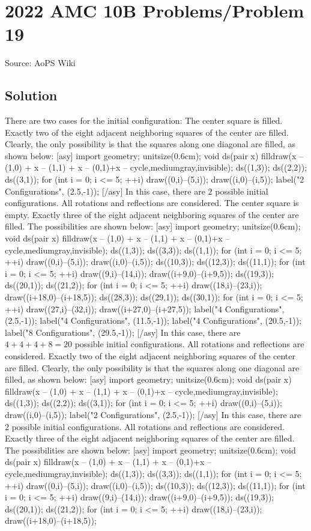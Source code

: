 \documentclass[12pt]{article}
\begin{document}
\section*{{2022 AMC 10B Problems/Problem 19}}
Source: AoPS Wiki

\subsection*{Solution}
There are two cases for the initial configuration: The center square is filled. Exactly two of the eight adjacent neighboring squares of the center are filled. Clearly, the only possibility is that the squares along one diagonal are filled, as shown below: [asy] import geometry; unitsize(0.6cm); void ds(pair x) { filldraw(x -- (1,0) + x -- (1,1) + x -- (0,1)+x -- cycle,mediumgray,invisible); } ds((1,3)); ds((2,2)); ds((3,1)); for (int i = 0; i <= 5; ++i) { draw((0,i)--(5,i)); draw((i,0)--(i,5)); } label("$2$ Configurations", (2.5,-1)); [/asy] In this case, there are $2$ possible initial configurations. All rotations and reflections are considered. The center square is empty. Exactly three of the eight adjacent neighboring squares of the center are filled. The possibilities are shown below: [asy] import geometry; unitsize(0.6cm); void ds(pair x) { filldraw(x -- (1,0) + x -- (1,1) + x -- (0,1)+x -- cycle,mediumgray,invisible); } ds((1,3)); ds((3,3)); ds((1,1)); for (int i = 0; i <= 5; ++i) { draw((0,i)--(5,i)); draw((i,0)--(i,5)); } ds((10,3)); ds((12,3)); ds((11,1)); for (int i = 0; i <= 5; ++i) { draw((9,i)--(14,i)); draw((i+9,0)--(i+9,5)); } ds((19,3)); ds((20,1)); ds((21,2)); for (int i = 0; i <= 5; ++i) { draw((18,i)--(23,i)); draw((i+18,0)--(i+18,5)); } ds((28,3)); ds((29,1)); ds((30,1)); for (int i = 0; i <= 5; ++i) { draw((27,i)--(32,i)); draw((i+27,0)--(i+27,5)); } label("$4$ Configurations", (2.5,-1)); label("$4$ Configurations", (11.5,-1)); label("$4$ Configurations", (20.5,-1)); label("$8$ Configurations", (29.5,-1)); [/asy] In this case, there are $4+4+4+8=20$ possible initial configurations. All rotations and reflections are considered. Exactly two of the eight adjacent neighboring squares of the center are filled. Clearly, the only possibility is that the squares along one diagonal are filled, as shown below: [asy] import geometry; unitsize(0.6cm); void ds(pair x) { filldraw(x -- (1,0) + x -- (1,1) + x -- (0,1)+x -- cycle,mediumgray,invisible); } ds((1,3)); ds((2,2)); ds((3,1)); for (int i = 0; i <= 5; ++i) { draw((0,i)--(5,i)); draw((i,0)--(i,5)); } label("$2$ Configurations", (2.5,-1)); [/asy] In this case, there are $2$ possible initial configurations. All rotations and reflections are considered. Exactly three of the eight adjacent neighboring squares of the center are filled. The possibilities are shown below: [asy] import geometry; unitsize(0.6cm); void ds(pair x) { filldraw(x -- (1,0) + x -- (1,1) + x -- (0,1)+x -- cycle,mediumgray,invisible); } ds((1,3)); ds((3,3)); ds((1,1)); for (int i = 0; i <= 5; ++i) { draw((0,i)--(5,i)); draw((i,0)--(i,5)); } ds((10,3)); ds((12,3)); ds((11,1)); for (int i = 0; i <= 5; ++i) { draw((9,i)--(14,i)); draw((i+9,0)--(i+9,5)); } ds((19,3)); ds((20,1)); ds((21,2)); for (int i = 0; i <= 5; ++i) { draw((18,i)--(23,i)); draw((i+18,0)--(i+18,5)); } 
\end{document}
